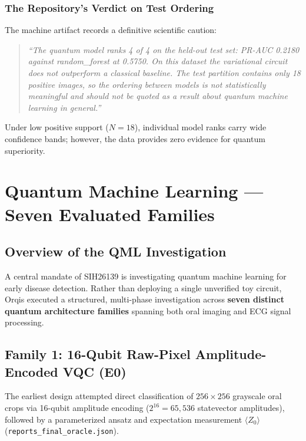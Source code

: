 \documentclass[11pt,a4paper]{report}
\newcommand{\artifact}[1]{\nolinkurl{#1}}
\begin{document}
\subsection{The Repository's Verdict on Test Ordering}
The machine artifact records a definitive scientific caution:
\begin{quote}
\textit{``The quantum model ranks 4 of 4 on the held-out test set: PR-AUC 0.2180 against random\_forest at 0.5750. On this dataset the variational circuit does not outperform a classical baseline. The test partition contains only 18 positive images, so the ordering between models is not statistically meaningful and should not be quoted as a result about quantum machine learning in general.''}
\end{quote}
Under low positive support ($N=18$), individual model ranks carry wide confidence bands; however, the data provides zero evidence for quantum superiority.

\chapter{Quantum Machine Learning --- Seven Evaluated Families}

\section{Overview of the QML Investigation}
A central mandate of SIH26139 is investigating quantum machine learning for early disease detection. Rather than deploying a single unverified toy circuit, Orqis executed a structured, multi-phase investigation across \textbf{seven distinct quantum architecture families} spanning both oral imaging and ECG signal processing.

\section{Family 1: 16-Qubit Raw-Pixel Amplitude-Encoded VQC (E0)}
The earliest design attempted direct classification of $256 \times 256$ grayscale oral crops via 16-qubit amplitude encoding ($2^{16} = 65,536$ statevector amplitudes), followed by a parameterized ansatz and expectation measurement $\langle Z_0 \rangle$ (\artifact{reports\_final\_oracle.json}).
\end{document}
